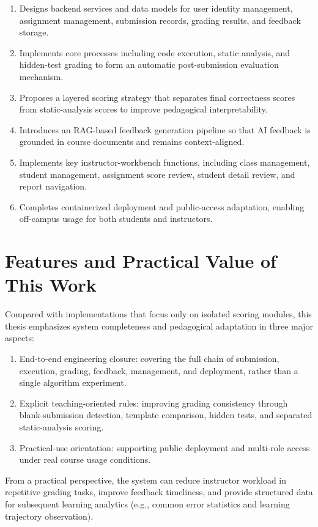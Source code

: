 \begin{enumerate}
\item Designs backend services and data models for user identity management, assignment management, submission records, grading results, and feedback storage.
\item Implements core processes including code execution, static analysis, and hidden-test grading to form an automatic post-submission evaluation mechanism.
\item Proposes a layered scoring strategy that separates final correctness scores from static-analysis scores to improve pedagogical interpretability.
\item Introduces an RAG-based feedback generation pipeline so that AI feedback is grounded in course documents and remains context-aligned.
\item Implements key instructor-workbench functions, including class management, student management, assignment score review, student detail review, and report navigation.
\item Completes containerized deployment and public-access adaptation, enabling off-campus usage for both students and instructors.
\end{enumerate}


\section{Features and Practical Value of This Work}

Compared with implementations that focus only on isolated scoring modules, this thesis emphasizes system completeness and pedagogical adaptation in three major aspects:

\begin{enumerate}
\item End-to-end engineering closure: covering the full chain of submission, execution, grading, feedback, management, and deployment, rather than a single algorithm experiment.
\item Explicit teaching-oriented rules: improving grading consistency through blank-submission detection, template comparison, hidden tests, and separated static-analysis scoring.
\item Practical-use orientation: supporting public deployment and multi-role access under real course usage conditions.
\end{enumerate}


From a practical perspective, the system can reduce instructor workload in repetitive grading tasks, improve feedback timeliness, and provide structured data for subsequent learning analytics (e.g., common error statistics and learning trajectory observation).

